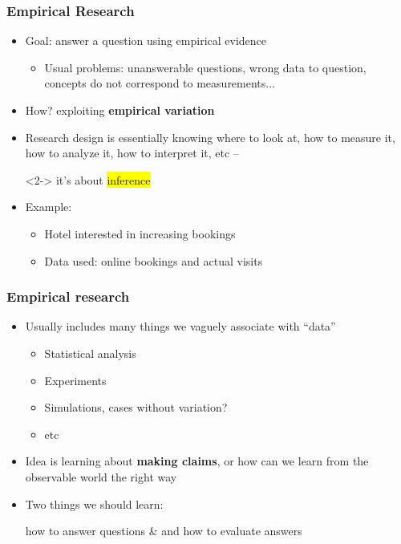 \documentclass[aspectratio=43]{beamer}
\begin{document}
\begin{frame}
\frametitle{Empirical Research}
\centering

\begin{itemize}
  \item Goal: answer a question using empirical evidence
  \begin{itemize}
    \item Usual problems: unanswerable questions, wrong data to question, concepts do not correspond to measurements...
  \end{itemize}
  \item<2-> How? exploiting \textbf{empirical variation}
  \item<2-> Research design is essentially knowing where to look at, how to measure it, how to analyze it, how to interpret it, etc --
  \item[]<2-> it's about \colorbox{yellow}{inference}
  \item<3-> Example:
    \begin{itemize}
      \item Hotel interested in increasing bookings
      \item Data used: online bookings and actual visits
    \end{itemize}
\end{itemize}

\end{frame}

\begin{frame}
\frametitle{Empirical research}
\centering

\begin{itemize}
  \item Usually includes many things we vaguely associate with ``data''
  \begin{itemize}
    \item Statistical analysis
    \item Experiments
    \item Simulations, cases without variation?
    \item etc
  \end{itemize}
  \item Idea is learning about \textbf{making claims}, or how can we learn from the observable world the right way
  \item Two things we should learn:
  \item[] how to answer questions \& and how to evaluate answers
\end{itemize}

\end{frame}
\end{document}
